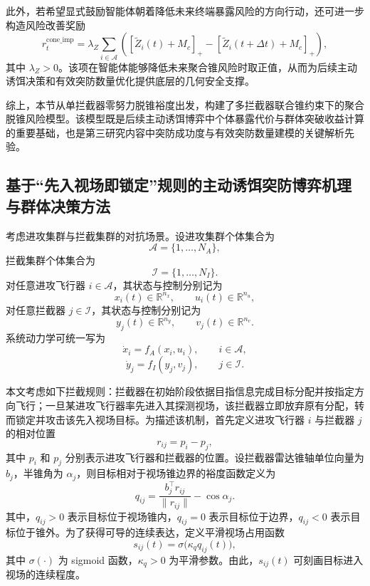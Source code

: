 此外，若希望显式鼓励智能体朝着降低未来终端暴露风险的方向行动，还可进一步构造风险改善奖励
\begin{equation}
r_t^{\mathrm{cone\_imp}}
=
\lambda_Z
\sum_{i\in\mathcal{A}}
\left(
[\widetilde Z_i(t)+M_c]_+
-
[\widetilde Z_i(t+\Delta t)+M_c]_+
\right),
\end{equation}
其中 $\lambda_Z>0$。该项在智能体能够降低未来聚合锥风险时取正值，从而为后续主动诱饵决策和有效突防数量优化提供底层的几何安全支撑。

综上，本节从单拦截器零努力脱锥裕度出发，构建了多拦截器联合锥约束下的聚合脱锥风险模型。该模型既是后续主动诱饵博弈中个体暴露代价与群体突破收益计算的重要基础，也是第三研究内容中突防成功度与有效突防数量建模的关键解析先验。



\subsection{基于“先入视场即锁定”规则的主动诱饵突防博弈机理与群体决策方法}

考虑进攻集群与拦截集群的对抗场景。设进攻集群个体集合为
\[
\mathcal{A}=\{1,\dots,N_A\},
\]
拦截集群个体集合为
\[
\mathcal{I}=\{1,\dots,N_I\}.
\]
对任意进攻飞行器 $i\in\mathcal{A}$，其状态与控制分别记为
\[
x_i(t)\in\mathbb{R}^{n_x},\qquad u_i(t)\in\mathbb{R}^{n_u},
\]
对任意拦截器 $j\in\mathcal{I}$，其状态与控制分别记为
\[
y_j(t)\in\mathbb{R}^{n_y},\qquad v_j(t)\in\mathbb{R}^{n_v}.
\]
系统动力学可统一写为
\begin{equation}
\dot x_i=f_A(x_i,u_i),\qquad i\in\mathcal{A},
\end{equation}
\begin{equation}
\dot y_j=f_I(y_j,v_j),\qquad j\in\mathcal{I}.
\end{equation}

本文考虑如下拦截规则：拦截器在初始阶段依据目指信息完成目标分配并按指定方向飞行；一旦某进攻飞行器率先进入其探测视场，该拦截器立即放弃原有分配，转而锁定并攻击该先入视场目标。为描述该机制，首先定义进攻飞行器 $i$ 与拦截器 $j$ 的相对位置
\begin{equation}
r_{ij}=p_i-p_j,
\end{equation}
其中 $p_i$ 和 $p_j$ 分别表示进攻飞行器和拦截器的位置。设拦截器雷达锥轴单位向量为 $b_j$，半锥角为 $\alpha_j$，则目标相对于视场锥边界的裕度函数定义为
\begin{equation}
q_{ij}
=
\frac{b_j^{\top}r_{ij}}{\|r_{ij}\|}-\cos\alpha_j.
\end{equation}
其中，$q_{ij}>0$ 表示目标位于视场锥内，$q_{ij}=0$ 表示目标位于边界，$q_{ij}<0$ 表示目标位于锥外。为了获得可导的连续表达，定义平滑视场占用函数
\begin{equation}
s_{ij}(t)=\sigma\!\bigl(\kappa_q q_{ij}(t)\bigr),
\end{equation}
其中 $\sigma(\cdot)$ 为 sigmoid 函数，$\kappa_q>0$ 为平滑参数。由此，$s_{ij}(t)$ 可刻画目标进入视场的连续程度。

